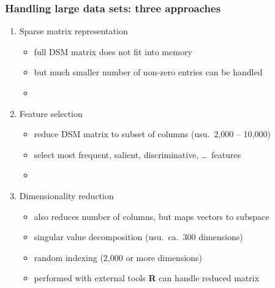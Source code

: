 \documentclass[t]{beamer} %
\begin{document}
\begin{frame}
  \frametitle{Handling large data sets: three approaches}

  \begin{enumerate}
  \item Sparse matrix representation
    \begin{itemize}
    \item full DSM matrix does not fit into memory
    \item but much smaller number of non-zero entries can be handled
    \item[] \pause
    \end{itemize}
  \item Feature selection
    \begin{itemize}
    \item reduce DSM matrix to subset of columns (usu.\ 2,000 -- 10,000)
    \item select most frequent, salient, discriminative, \ldots\ features
    \item[] \pause
    \end{itemize}
  \item Dimensionality reduction
    \begin{itemize}
    \item also reduces number of columns, but maps vectors to subspace
    \item singular value decomposition (usu.\ ca.\ 300 dimensions)
    \item random indexing (2,000 or more dimensions)
    \item performed with external tools \so \textbf{R} can handle reduced matrix
    \end{itemize}
  \end{enumerate}
\end{frame}
\end{document}
